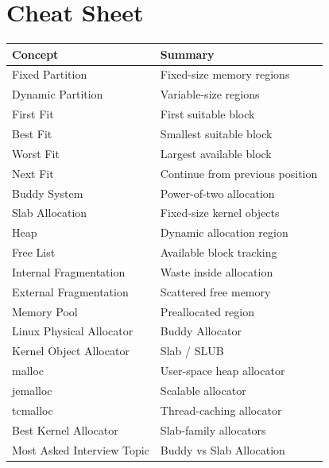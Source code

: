 \section{Cheat Sheet}

\begin{longtable}{|p{5cm}|p{8cm}|}
\hline
Concept & Summary \\
\hline
Fixed Partition & Fixed-size memory regions \\
\hline
Dynamic Partition & Variable-size regions \\
\hline
First Fit & First suitable block \\
\hline
Best Fit & Smallest suitable block \\
\hline
Worst Fit & Largest available block \\
\hline
Next Fit & Continue from previous position \\
\hline
Buddy System & Power-of-two allocation \\
\hline
Slab Allocation & Fixed-size kernel objects \\
\hline
Heap & Dynamic allocation region \\
\hline
Free List & Available block tracking \\
\hline
Internal Fragmentation & Waste inside allocation \\
\hline
External Fragmentation & Scattered free memory \\
\hline
Memory Pool & Preallocated region \\
\hline
Linux Physical Allocator & Buddy Allocator \\
\hline
Kernel Object Allocator & Slab / SLUB \\
\hline
malloc & User-space heap allocator \\
\hline
jemalloc & Scalable allocator \\
\hline
tcmalloc & Thread-caching allocator \\
\hline
Best Kernel Allocator & Slab-family allocators \\
\hline
Most Asked Interview Topic & Buddy vs Slab Allocation \\
\hline
\end{longtable}